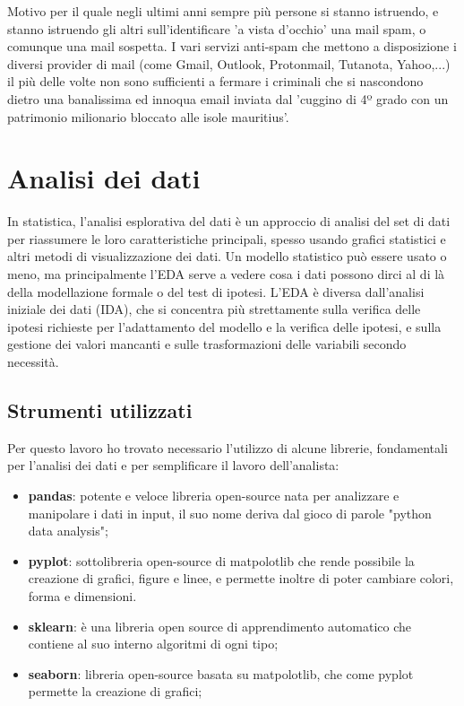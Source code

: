 \documentclass[12pt,a4paper]{article}
\begin{document}
Motivo per il quale negli ultimi anni sempre più persone si stanno istruendo, e stanno istruendo gli altri sull'identificare 'a vista d'occhio' una mail spam, o comunque una mail sospetta. 
\break
I vari servizi anti-spam che mettono a disposizione i diversi provider di mail (come Gmail, Outlook, Protonmail, Tutanota, Yahoo,...) il più delle volte non sono sufficienti a fermare i criminali che si nascondono dietro una banalissima ed innoqua email inviata dal 'cuggino di 4º grado con un patrimonio milionario bloccato alle isole mauritius'.

\clearpage
\section{Analisi dei dati}
In statistica, l'analisi esplorativa del dati è un approccio di analisi del set di dati per riassumere le loro caratteristiche principali, spesso usando grafici statistici e altri metodi di visualizzazione dei dati. Un modello statistico può essere usato o meno, ma principalmente l'EDA serve a vedere cosa i dati possono dirci al di là della modellazione formale o del test di ipotesi. L'EDA è diversa dall'analisi iniziale dei dati (IDA), che si concentra più strettamente sulla verifica delle ipotesi richieste per l'adattamento del modello e la verifica delle ipotesi, e sulla gestione dei valori mancanti e sulle trasformazioni delle variabili secondo necessità. 

\subsection{Strumenti utilizzati}
Per questo lavoro ho trovato necessario l'utilizzo di alcune librerie, fondamentali per l'analisi dei dati e per semplificare il lavoro dell'analista:
\begin{itemize}
    \item \textbf{pandas}: potente e veloce libreria open-source nata per analizzare e manipolare i dati in input, il suo nome deriva dal gioco di parole "python data analysis";
\end{itemize}

\begin{itemize}
    \item \textbf{pyplot}: sottolibreria open-source di matpolotlib che rende possibile la creazione di grafici, figure e linee, e permette inoltre di poter cambiare colori, forma e dimensioni.
\end{itemize}
\begin{itemize}
    \item \textbf{sklearn}: è una libreria open source di apprendimento automatico che contiene al suo interno algoritmi di ogni tipo;
\end{itemize}
\begin{itemize}
    \item \textbf{seaborn}: libreria open-source basata su  matpolotlib, che come pyplot permette la creazione di grafici;
\end{itemize}
\end{document}
